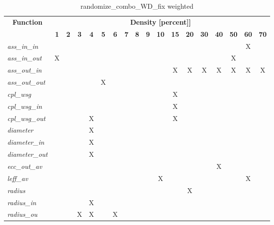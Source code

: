 \begin{table}[h] \centering \begin{tabular}{|l|c|c|c|c|c|c|c|c|c|c|c|c|c|c|c|c|c|} \hline\multicolumn{1}{|c|}{\textbf{\large{Function}}} & \multicolumn{17}{c|}{\large{\textbf{Density [percent]]}}}\\\cline{2-18}  & \textbf{1} &  \textbf{2} &  \textbf{3} &  \textbf{4} &  \textbf{5} &  \textbf{6} &  \textbf{7} &  \textbf{8} &  \textbf{9} &  \textbf{10} &  \textbf{15} &  \textbf{20} &  \textbf{30} &  \textbf{40} &  \textbf{50} &  \textbf{60} &  \textbf{70} \\ \hline   \textit{ass\_in\_in} &   &   &   &   &   &   &   &   &   &   &   &   &   &   &   & X &   \\ \hline  \textit{ass\_in\_out} & X &   &   &   &   &   &   &   &   &   &   &   &   &   & X &   &   \\ \hline  \textit{ass\_out\_in} &   &   &   &   &   &   &   &   &   &   & X & X & X & X & X & X & X \\ \hline  \textit{ass\_out\_out} &   &   &   &   & X &   &   &   &   &   &   &   &   &   &   &   &   \\ \hline  \textit{cpl\_wsg} &   &   &   &   &   &   &   &   &   &   & X &   &   &   &   &   &   \\ \hline  \textit{cpl\_wsg\_in} &   &   &   &   &   &   &   &   &   &   & X &   &   &   &   &   &   \\ \hline  \textit{cpl\_wsg\_out} &   &   &   & X &   &   &   &   &   &   & X &   &   &   &   &   &   \\ \hline  \textit{diameter} &   &   &   & X &   &   &   &   &   &   &   &   &   &   &   &   &   \\ \hline  \textit{diameter\_in} &   &   &   & X &   &   &   &   &   &   &   &   &   &   &   &   &   \\ \hline  \textit{diameter\_out} &   &   &   & X &   &   &   &   &   &   &   &   &   &   &   &   &   \\ \hline  \textit{ecc\_out\_av} &   &   &   &   &   &   &   &   &   &   &   &   &   & X &   &   &   \\ \hline  \textit{leff\_av} &   &   &   &   &   &   &   &   &   & X &   &   &   &   &   & X &   \\ \hline  \textit{radius} &   &   &   &   &   &   &   &   &   &   &   & X &   &   &   &   &   \\ \hline  \textit{radius\_in} &   &   &   & X &   &   &   &   &   &   &   &   &   &   &   &   &   \\ \hline  \textit{radius\_ou} &   &   & X & X &   & X &   &   &   &   &   &   &   &   &   &   &   \\ \hline \end{tabular}\caption{randomize\_combo\_WD\_fix weighted}\label{tab:my_label} \end{table}